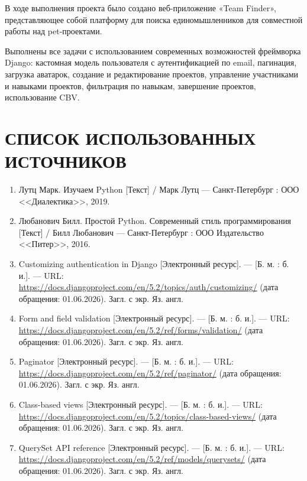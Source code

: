 \documentclass[bachelor, och, pract]{../SCWorks}
\begin{document}
В ходе выполнения проекта было создано веб-приложение «Team Finder», представляющее собой платформу для поиска единомышленников для совместной работы над pet-проектами.

Выполнены все задачи с использованием современных возможностей фреймворка Django: кастомная модель пользователя с аутентификацией по email, пагинация, загрузка аватарок, создание и редактирование проектов, управление участниками и навыками проектов, фильтрация по навыкам, завершение проектов, использование CBV.

\newpage
\section*{СПИСОК ИСПОЛЬЗОВАННЫХ ИСТОЧНИКОВ}

\begin{enumerate}
    \item Лутц Марк. Изучаем Python [Текст] / Марк Лутц --- Санкт-Петербург :  ООО <<Диалектика>>, 2019.
    \item Любанович Билл. Простой Python. Современный стиль программирования [Текст] / Билл Любанович --- Санкт-Петербург :  ООО Издательство <<Питер>>, 2016.
    \item Customizing authentication in Django [Электронный ресурс]. --- [Б. м. : б. и.]. --- URL: \url{https://docs.djangoproject.com/en/5.2/topics/auth/customizing/} (дата обращения: 01.06.2026). Загл. с экр. Яз. англ.

    \item Form and field validation [Электронный ресурс]. --- [Б. м. : б. и.]. --- URL: \url{https://docs.djangoproject.com/en/5.2/ref/forms/validation/} (дата обращения: 01.06.2026). Загл. с экр. Яз. англ.
    
    \item Paginator [Электронный ресурс]. --- [Б. м. : б. и.]. --- URL: \url{https://docs.djangoproject.com/en/5.2/ref/paginator/} (дата обращения: 01.06.2026). Загл. с экр. Яз. англ.

    \item Class-based views [Электронный ресурс]. --- [Б. м. : б. и.]. --- URL: \url{https://docs.djangoproject.com/en/5.2/topics/class-based-views/} (дата обращения: 01.06.2026). Загл. с экр. Яз. англ.

    \item QuerySet API reference [Электронный ресурс]. --- [Б. м. : б. и.]. --- URL: \url{https://docs.djangoproject.com/en/5.2/ref/models/querysets/} (дата обращения: 01.06.2026). Загл. с экр. Яз. англ.

\end{enumerate}
\end{document}
